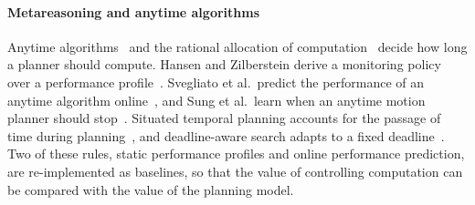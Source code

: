 \paragraph{Metareasoning and anytime algorithms} Anytime algorithms~\cite{dean1988analysis,zilberstein1996using} and the
rational allocation of computation~\cite{russell1991right,boddy1994deliberation} decide how long a
planner should compute. Hansen and Zilberstein derive a monitoring policy over a performance
profile~\cite{hansen2001monitoring}. Svegliato et al.\ predict the performance of an anytime algorithm
online~\cite{svegliato2018meta}, and Sung
et al.\ learn when an anytime motion planner should stop~\cite{sung2021quit}. Situated temporal planning accounts for
the passage of time during planning~\cite{cashmore2018clock,shperberg2021situated}, and
deadline-aware search adapts to a fixed deadline~\cite{dionne2011deadline}. Two of these rules, static performance
profiles and online performance prediction, are re-implemented as baselines, so that the value of controlling
computation can be compared with the value of the planning model.
